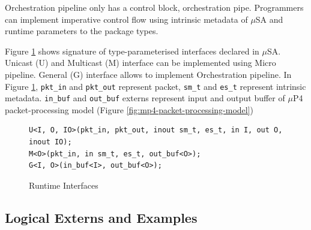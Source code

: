 \documentclass{hotnets19}
\begin{document}
Orchestration pipeline only has a control block, orchestration pipe.
Programmers can implement imperative control flow using intrinsic metadata of $\mu$SA and runtime parameters to the package types.

Figure \ref{fig:interfaces} shows signature of type-parameterised interfaces declared in $\mu$SA.
Unicast (U) and Multicast (M) interface can be implemented using Micro pipeline.
General (G) interface allows to implement Orchestration pipeline.
In Figure \ref{fig:interfaces}, \texttt{pkt\_in} and \texttt{pkt\_out} represent packet, \texttt{sm\_t} and \texttt{es\_t} represent intrinsic metadata.
\texttt{in\_buf} and \texttt{out\_buf} externs represent input and output buffer of $\mu$P4 packet-processing model (Figure \ref{fig:mp4-packet-processing-model})
\begin{figure}
\begin{lstlisting}[frame=none]
U<I, O, IO>(pkt_in, pkt_out, inout sm_t, es_t, in I, out O, inout IO); 
M<O>(pkt_in, in sm_t, es_t, out_buf<O>);
G<I, O>(in_buf<I>, out_buf<O>);
\end{lstlisting}
\caption{Runtime Interfaces}
\label{fig:interfaces}
\end{figure}

\subsection{Logical Externs and Examples}
% 
% 

\end{document}
